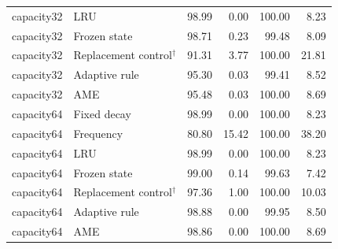 \begin{longtable}{llrrrr}
capacity32 & LRU & 98.99 & 0.00 & 100.00 & 8.23\\
capacity32 & Frozen state & 98.71 & 0.23 & 99.48 & 8.09\\
capacity32 & Replacement control$^{\dagger}$ & 91.31 & 3.77 & 100.00 & 21.81\\
capacity32 & Adaptive rule & 95.30 & 0.03 & 99.41 & 8.52\\
capacity32 & AME & 95.48 & 0.03 & 100.00 & 8.69\\
capacity64 & Fixed decay & 98.99 & 0.00 & 100.00 & 8.23\\
capacity64 & Frequency & 80.80 & 15.42 & 100.00 & 38.20\\
capacity64 & LRU & 98.99 & 0.00 & 100.00 & 8.23\\
capacity64 & Frozen state & 99.00 & 0.14 & 99.63 & 7.42\\
capacity64 & Replacement control$^{\dagger}$ & 97.36 & 1.00 & 100.00 & 10.03\\
capacity64 & Adaptive rule & 98.88 & 0.00 & 99.95 & 8.50\\
capacity64 & AME & 98.86 & 0.00 & 100.00 & 8.69\\
\bottomrule\end{longtable}
